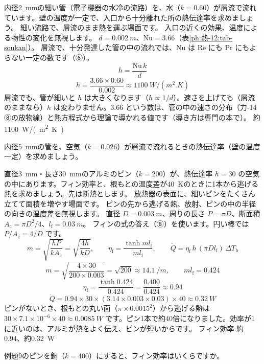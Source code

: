 \label{ph:熱-12:ex8}
\begin{phreidai}[細い管の層流の熱伝達率]
内径\qty{2}{mm}の細い管（電子機器の水冷の流路）を、水（$k=0.60$）が層流で流れています。壁の温度が一定で、入口から十分離れた所の熱伝達率を求めましょう。
\phbamen
細い流路で、層流のまま熱を運ぶ場面です。
\phmushi
入口の近くの効果、温度による物性の変化を無視します。
\phzu
$d=\qty{0.002}{m}$、$\mathrm{Nu}=3.66$（表\ref{ph:熱-12:tab-soukan}）。
\phriyu
層流で、十分発達した管の中の流れでは、Nu は Re にも Pr にもよらない一定の数です（⑥）。
\phtateru
\[h=\frac{\mathrm{Nu}\,k}{d}\]
\phtoku
\[h=\frac{3.66\times0.60}{0.002}\approx\qty{1100}{W/(m^2.K)}\]
\phtashikame
層流でも、管が細いと $h$ は大きくなります（$h\propto1/d$）。速さを上げても（層流のままなら）$h$ は変わりません。3.66 という数は、管の中の速さの分布（力-14 ⑧の放物線）と熱方程式から理論で導かれる値です（導き方は専門の本で）。
\kotae 約\qty{1100}{W/(m^2.K)}
\end{phreidai}
\begin{jibun}
内径\qty{5}{mm}の管を、空気（$k=0.026$）が層流で流れるときの熱伝達率（壁の温度一定）を求めましょう。
\end{jibun}

\label{ph:熱-12:ex9}
\begin{phreidai}[アルミのピンフィン]
直径\qty{3}{mm}・長さ\qty{30}{mm}のアルミのピン（$k=200$）が、熱伝達率 $h=30$ の空気の中にあります。フィン効率と、根もとの温度差が\qty{40}{K}のときに1本から逃げる熱を求めましょう。先は断熱とします。
\phbamen
放熱器の表面に、細いピンをたくさん立てて面積を増やす場面です。
\phmushi
ピンの先から逃げる熱、放射、ピンの中の半径の向きの温度差を無視します。
\phzu
直径 $D=\qty{0.003}{m}$、周りの長さ $P=\pi D$、断面積 $A_{\mathrm c}=\pi D^2/4$、$l_{\mathrm f}=\qty{0.03}{m}$。
\phriyu
フィンの式の答え（⑧）を使います。円い棒では $P/A_{\mathrm c}=4/D$ です。
\phtateru
\[m=\sqrt{\frac{hP}{kA_{\mathrm c}}}=\sqrt{\frac{4h}{kD}},\qquad\eta_{\mathrm f}=\frac{\tanh ml_{\mathrm f}}{ml_{\mathrm f}},\qquad\dot Q=\eta_{\mathrm f}\,h\,(\pi Dl_{\mathrm f})\,\Delta T_{\mathrm b}\]
\phtoku
\[m=\sqrt{\frac{4\times30}{200\times0.003}}=\sqrt{200}\approx\qty{14.1}{/m},\qquad ml_{\mathrm f}=0.424\]
\[\eta_{\mathrm f}=\frac{\tanh0.424}{0.424}=\frac{0.400}{0.424}\approx0.94\]
\[\dot Q=0.94\times30\times(3.14\times0.003\times0.03)\times40\approx\qty{0.32}{W}\]
\phtashikame
ピンがないとき、根もとの丸い面（$\pi\times0.0015^2$）から逃げる熱は $30\times7.1\times10^{-6}\times40\approx\qty{0.0085}{W}$ です。ピン1本で約40倍になりました。効率が1に近いのは、アルミが熱をよく伝え、ピンが短いからです。
\kotae フィン効率 約0.94、約\qty{0.32}{W}
\end{phreidai}
\begin{jibun}
例題9のピンを銅（$k=400$）にすると、フィン効率はいくらですか。
\end{jibun}

